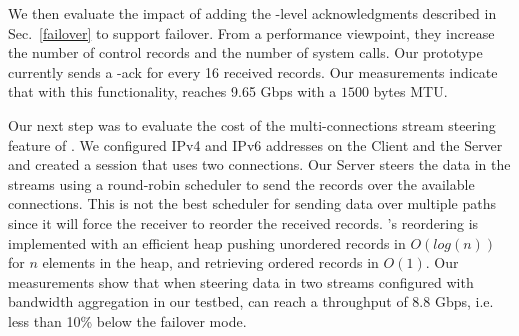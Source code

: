 
We then evaluate the impact of adding the \tcpls-level acknowledgments
described in Sec.~\ref{failover} to support failover.
From a performance viewpoint, they increase the number of control records and
the number of system calls. Our prototype currently sends a \tcpls-ack for every
16 received records. Our measurements indicate that with this functionality,
\tcpls reaches 9.65 Gbps with a $1500$ bytes MTU.



Our next step was to evaluate the cost of the multi-connections stream steering feature of \tcpls.
We configured IPv4 and IPv6 addresses on the Client and the Server and created
a \tcpls session that uses two \tcp connections. Our Server steers the data in
the \tcpls streams using a
round-robin scheduler to send the records over the available connections. This
is not the best scheduler for sending data over multiple paths~\cite{paasch2014experimental} since it will force the
receiver to reorder the received records. \tcpls’s reordering is implemented
with an efficient heap pushing unordered records in $O(log(n))$
for $n$ elements in the heap, and retrieving ordered records
in $O(1)$. Our measurements show that when steering data in two streams
configured with bandwidth aggregation in our testbed,
\tcpls can reach a throughput of 8.8 Gbps, i.e. less than 10\% below the
failover mode.

